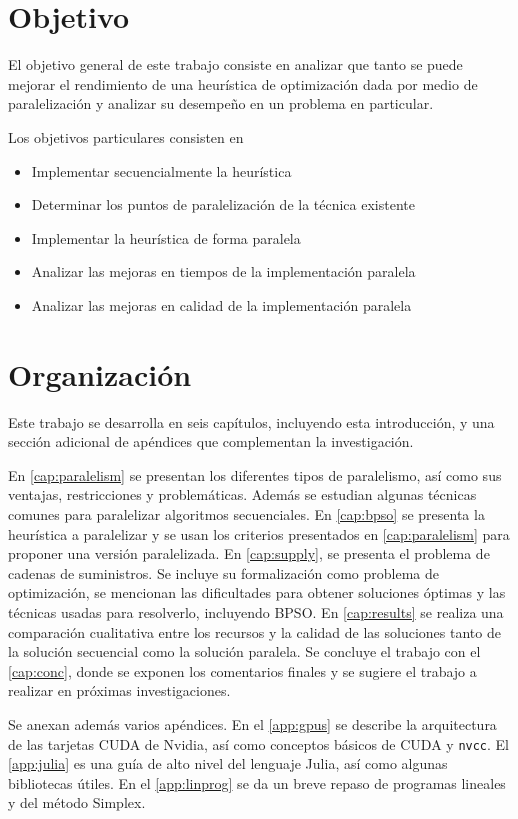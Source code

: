 \section{Objetivo}

El objetivo general de este trabajo consiste en analizar que tanto se puede
mejorar el rendimiento de una heurística de optimización dada por medio de
paralelización y analizar su desempeño en un problema en particular.

Los objetivos particulares consisten en

\begin{itemize}
  \item Implementar secuencialmente la heurística
  \item Determinar los puntos de paralelización de la técnica existente
  \item Implementar la heurística de forma paralela
  \item Analizar las mejoras en tiempos de la implementación paralela
  \item Analizar las mejoras en calidad de la implementación paralela
\end{itemize}

\section{Organización}

Este trabajo se desarrolla en seis capítulos, incluyendo esta introducción, y
una sección adicional de apéndices que complementan la investigación.

En \cref{cap:paralelism} se presentan los diferentes tipos de paralelismo,
así como sus ventajas, restricciones y problemáticas. Además se estudian
algunas técnicas comunes para paralelizar algoritmos secuenciales. En
\cref{cap:bpso} se presenta la heurística a paralelizar y se usan los criterios
presentados en \cref{cap:paralelism} para proponer una versión paralelizada.
En \cref{cap:supply}, se presenta el problema de cadenas de suministros. Se
incluye su formalización como problema de optimización, se mencionan las
dificultades para obtener soluciones óptimas y las técnicas usadas para
resolverlo, incluyendo BPSO. En \cref{cap:results} se realiza una comparación
cualitativa entre los recursos y la calidad de las soluciones tanto de la
solución secuencial como la solución paralela. Se concluye el trabajo con
el \cref{cap:conc}, donde se exponen los comentarios finales y se sugiere el
trabajo a realizar en próximas investigaciones.

Se anexan además varios apéndices. En el \cref{app:gpus} se describe la
arquitectura de las tarjetas CUDA de Nvidia, así como conceptos básicos de
CUDA y \texttt{nvcc}. El \cref{app:julia} es una guía de alto nivel del
lenguaje Julia, así como algunas bibliotecas útiles. En el \cref{app:linprog}
se da un breve repaso de programas lineales y del método Simplex.
